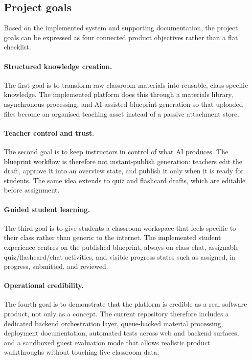 \documentclass[11pt,a4paper]{article}
\begin{document}
\subsection{Project goals}

Based on the implemented system and supporting documentation, the project goals can be expressed as
four connected product objectives rather than a flat checklist.

\paragraph*{Structured knowledge creation.}
The first goal is to transform raw classroom materials into reusable, class-specific knowledge. The
implemented platform does this through a materials library, asynchronous processing, and AI-assisted
blueprint generation so that uploaded files become an organised teaching asset instead of a passive
attachment store.

\paragraph*{Teacher control and trust.}
The second goal is to keep instructors in control of what AI produces. The blueprint workflow is
therefore not instant-publish generation: teachers edit the draft, approve it into an overview
state, and publish it only when it is ready for students. The same idea extends to quiz and
flashcard drafts, which are editable before assignment.

\paragraph*{Guided student learning.}
The third goal is to give students a classroom workspace that feels specific to their class rather
than generic to the internet. The implemented student experience centres on the published blueprint,
always-on class chat, assignable quiz/flashcard/chat activities, and visible progress states such as
assigned, in progress, submitted, and reviewed.

\paragraph*{Operational credibility.}
The fourth goal is to demonstrate that the platform is credible as a real software product, not only
as a concept. The current repository therefore includes a dedicated backend orchestration layer,
queue-backed material processing, deployment documentation, automated tests across web and backend
surfaces, and a sandboxed guest evaluation mode that allows realistic product walkthroughs without
touching live classroom data.
\end{document}
